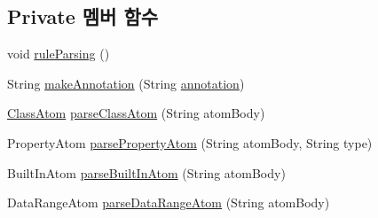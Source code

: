 \subsection*{Private 멤버 함수}
\begin{DoxyCompactItemize}
\item 
void \mbox{\hyperlink{classcom_1_1github_1_1aites_1_1framework_1_1rule_1_1_s_w_r_lrule_a1521b7ed4a4dc7b19712c12501ffec0c}{rule\+Parsing}} ()
\item 
String \mbox{\hyperlink{classcom_1_1github_1_1aites_1_1framework_1_1rule_1_1_s_w_r_lrule_a504b81036fa3b32cede4a4a5a94929d6}{make\+Annotation}} (String \mbox{\hyperlink{classcom_1_1github_1_1aites_1_1framework_1_1rule_1_1_s_w_r_lrule_af98a0b14045d483b30ad511f0627fe3f}{annotation}})
\item 
\mbox{\hyperlink{classcom_1_1github_1_1aites_1_1framework_1_1rule_1_1_s_w_r_lrule_1_1_class_atom}{Class\+Atom}} \mbox{\hyperlink{classcom_1_1github_1_1aites_1_1framework_1_1rule_1_1_s_w_r_lrule_ab01ac639c58b1478dc20272002106798}{parse\+Class\+Atom}} (String atom\+Body)
\item 
Property\+Atom \mbox{\hyperlink{classcom_1_1github_1_1aites_1_1framework_1_1rule_1_1_s_w_r_lrule_a5d90fa24f6f2a2db3a435905f68bbce2}{parse\+Property\+Atom}} (String atom\+Body, String type)
\item 
Built\+In\+Atom \mbox{\hyperlink{classcom_1_1github_1_1aites_1_1framework_1_1rule_1_1_s_w_r_lrule_a7880f0990348da202843776ba08e7514}{parse\+Built\+In\+Atom}} (String atom\+Body)
\item 
Data\+Range\+Atom \mbox{\hyperlink{classcom_1_1github_1_1aites_1_1framework_1_1rule_1_1_s_w_r_lrule_a98d9bcca97665200e8459358556d899d}{parse\+Data\+Range\+Atom}} (String atom\+Body)
\end{DoxyCompactItemize}
